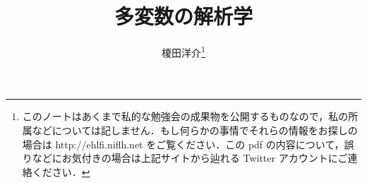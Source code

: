 \documentclass[uplatex,11pt,a4]{jsarticle}
\begin{document}
\title{多変数の解析学}
\author{榎田洋介\thanks{このノートはあくまで私的な勉強会の成果物を公開するものなので，私の所属などについては記しません．もし何らかの事情でそれらの情報をお探しの場合は http://ehlfi.niflh.net をご覧ください．この pdf の内容について，誤りなどにお気付きの場合は上記サイトから辿れる Twitter アカウントにご連絡ください．}}
\date{}
\maketitle

\newpage





\newpage

\tableofcontents

\newpage



\newpage



\newpage



\newpage



%
%
%
%
%
\end{document}
